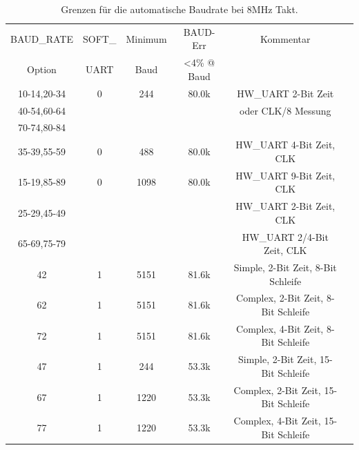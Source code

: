 \begin{table}[H]
  \begin{center}
    \begin{tabular}{| c | c | c | c | c | c |}
    \hline
   BAUD\_RATE  & SOFT\_ & Minimum & BAUD-Err   & Kommentar  \\
   Option      & UART   & Baud    & \textless 4\% @ Baud &  \\
    \hline
  10-14,20-34  &  0     &  244      &   80.0k  & HW\_UART 2-Bit Zeit  \\
  40-54,60-64  &        &           &          & oder CLK/8 Messung         \\
  70-74,80-84  &        &           &          &                            \\
    \hline
  35-39,55-59  &  0     &  488      &   80.0k  & HW\_UART 4-Bit Zeit, CLK \\
    \hline
  15-19,85-89  &  0     &  1098     &   80.0k  & HW\_UART 9-Bit Zeit, CLK \\
  25-29,45-49  &        &           &          & HW\_UART 2-Bit Zeit, CLK \\
  65-69,75-79  &        &           &          & HW\_UART 2/4-Bit Zeit, CLK \\
    \hline
    42         &  1     &  5151     &   81.6k  & Simple, 2-Bit Zeit, 8-Bit Schleife  \\
    \hline
    62         &  1     &  5151     &   81.6k  & Complex, 2-Bit Zeit, 8-Bit Schleife  \\
    \hline
    72         &  1     &  5151     &   81.6k  & Complex, 4-Bit Zeit, 8-Bit Schleife  \\
    \hline
    47         &  1     &  244      &   53.3k  &  Simple, 2-Bit Zeit, 15-Bit Schleife\\
    \hline
    67         &  1     &  1220     &   53.3k  &  Complex, 2-Bit Zeit, 15-Bit Schleife \\
    \hline
    77         &  1     &  1220     &   53.3k  & Complex, 4-Bit Zeit, 15-Bit Schleife \\
    \hline
    \end{tabular}
  \end{center}
  \caption{Grenzen für die automatische Baudrate bei 8MHz Takt.}
  \label{tab:AutoBaud8}
\end{table}

